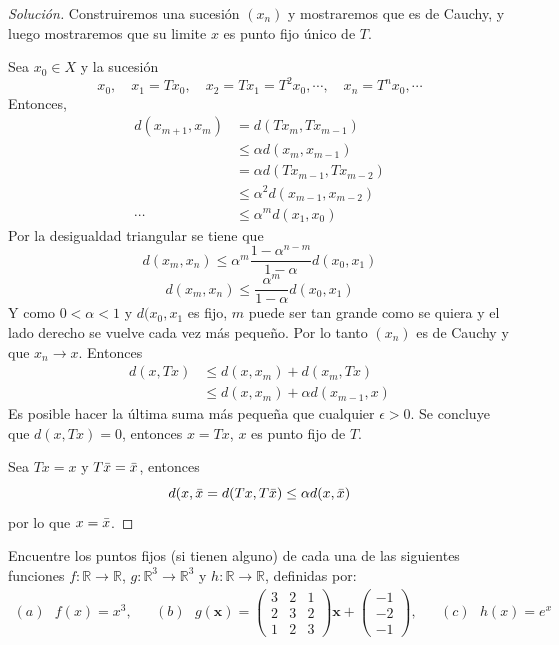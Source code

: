 \documentclass[12pt]{book}
\newcommand{\R}{\mathbb{R}}
\newenvironment{solucion}
  {\renewcommand\qedsymbol{$\square$}\begin{proof}[Solución]}
  {\end{proof}}
\begin{document}
\begin{solucion}
Construiremos una sucesión $(x_n)$ y mostraremos que es de Cauchy, y luego mostraremos que su limite $x$ es punto fijo único de $T$.

Sea $x_0\in X$ y la sucesión
\[x_0,\quad x_1=Tx_0,\quad x_2=Tx_1=T^2x_0,\cdots,\quad x_n=T^nx_0,\cdots\]
Entonces,
\begin{align*}
    d(x_{m+1},x_m)&=d(Tx_m,Tx_{m-1})\\
    &\leq\alpha d(x_m,x_{m-1})\\
    &=\alpha d(Tx_{m-1},Tx_{m-2})\\
    &\leq\alpha^2d(x_{m-1},x_{m-2})\\
    \cdots&\leq\alpha^md(x_1,x_0)
\end{align*}
Por la desigualdad triangular se tiene que
\[d(x_m,x_n)\leq\alpha^m\frac{1-\alpha^{n-m}}{1-\alpha}d(x_0,x_1)\]
\[d(x_m,x_n)\leq\frac{\alpha^m}{1-\alpha}d(x_0,x_1)\]
Y como $0<\alpha<1$ y $d(x_0,x_1$ es fijo, $m$ puede ser tan grande como se quiera y el lado derecho se vuelve cada vez más pequeño. Por lo tanto $(x_n)$ es de Cauchy y que $x_n\to x$. Entonces
\begin{align*}
    d(x,Tx)&\leq d(x,x_m)+d(x_m,Tx)\\
    &\leq d(x,x_m)+\alpha d(x_{m-1},x)
\end{align*}
Es posible hacer la última suma más pequeña que cualquier $\epsilon>0$. Se concluye que $d(x,Tx)=0$, entonces $x=Tx$, $x$ es punto fijo de $T$.

Sea $Tx=x$ y $T\Bar{x}=\Bar{x}$, entonces
\[d(x,\Bar{x}=d(Tx,T\Bar{x})\leq\alpha d(x,\Bar{x})\]
por lo que $x=\Bar{x}$.
\end{solucion}
\eje Encuentre los puntos fijos (si tienen alguno) de cada una de las siguientes funciones $f:\R\to\R$, $g:\R^3\to\R^3$ y $h:\R\to\R$, definidas por:
\begin{align*}
    (a)\textrm{  }f(x)=x^3, & & (b)\textrm{  }g(\bm{x})=\begin{pmatrix}
    3&2&1\\
    2&3&2\\
    1&2&3
    \end{pmatrix}\bm{x}+\begin{pmatrix}
    -1\\-2\\-1
    \end{pmatrix},& & (c)\textrm{  }h(x)=e^x
\end{align*}
\end{document}
